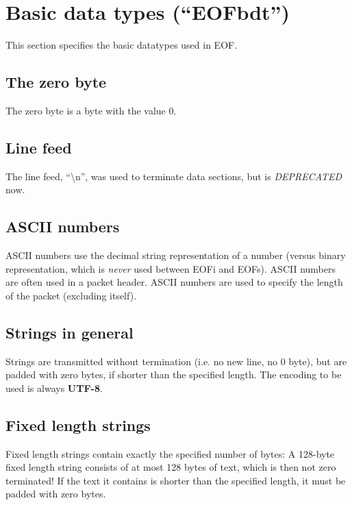 
\section{Basic data types ("`EOFbdt"')}
This section specifies the basic datatypes used in EOF.
\subsection{The zero byte}
The zero byte is a byte with the value 0.
\subsection{Line feed}
The line feed, "`\textbackslash{}n"', was used to terminate data
sections, but is \emph{DEPRECATED} now.
\subsection{ASCII numbers}
ASCII numbers use the decimal string representation of a number (versus
binary representation, which is \emph{never} used between EOFi and EOFs).
ASCII numbers are often used in a packet header.
ASCII numbers are used to specify the length of the packet (excluding itself).
\subsection{Strings in general}
Strings are transmitted without termination (i.e. no new line, no 0 byte),
but are padded with zero bytes, if shorter than the specified length.
The encoding to be used is always \textbf{UTF-8}\cite{utf8}.
\subsection{Fixed length strings}
Fixed length strings contain exactly the specified number of bytes:
A 128-byte fixed length string consists of at most 128 bytes of text,
which is then not zero terminated!
If the text it contains is shorter than the specified length,
it must be padded with zero bytes.
